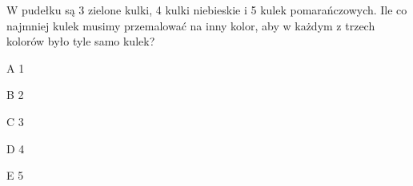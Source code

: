 \begin{tresc}
W pudełku są 3 zielone kulki, 4 kulki niebieskie i 5 kulek pomarańczowych. Ile co najmniej kulek musimy przemalować na inny kolor, aby w każdym z trzech kolorów było tyle samo kulek?
\end{tresc}
\begin{wariant}{A} 1 \end{wariant}
\begin{wariant}{B} 2 \end{wariant}
\begin{wariant}{C} 3 \end{wariant}
\begin{wariant}{D} 4 \end{wariant}
\begin{wariant}{E} 5 \end{wariant}
